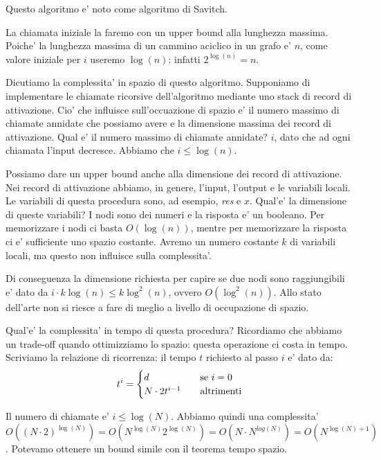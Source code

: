 Questo algoritmo e' noto come algoritmo di Savitch.

La chiamata iniziale la faremo con un upper bound alla lunghezza massima. Poiche' la lunghezza
massima di un cammino aciclico in un grafo e' $n$, come valore iniziale per $i$ useremo $\log(n)$:
infatti $2^{\log(n)} = n$.

Dicutiamo la complessita' in spazio di questo algoritmo. Supponiamo di implementare le chiamate
ricorsive dell'algoritmo mediante uno stack di record di attivazione. Cio' che influisce
sull'occuazione di spazio e' il numero massimo di chiamate annidate che possiamo avere e la
dimensione massima dei record di attivazione. Qual e' il numero massimo di chiamate annidate? $i$,
dato che ad ogni chiamata l'input decresce. Abbiamo che $i \leq \log(n)$.

Possiamo dare un upper bound anche alla dimensione dei record di attivazione. Nei record di
attivazione abbiamo, in genere, l'input, l'output e le variabili locali. Le variabili di questa
procedura sono, ad esempio, \textit{res} e $x$. Qual'e' la dimensione di queste variabili? I nodi
sono dei numeri e la risposta e' un booleano. Per memorizzare i nodi ci basta $O(\log(n))$, mentre
per memorizzare la risposta ci e' sufficiente uno spazio costante. Avremo un numero costante $k$ di
variabili locali, ma questo non influisce sulla complessita'.

Di conseguenza la dimensione richiesta per capire se due nodi sono raggiungibili e' dato da $i\cdot
k\log(n) \leq k\log^{2}(n)$, ovvero $O(\log^{2}(n))$. Allo stato dell'arte non si riesce a fare di
meglio a livello di occupazione di spazio.

Qual'e' la complessita' in tempo di questa procedura? Ricordiamo che abbiamo un trade-off quando
ottimizziamo lo spazio: questa operazione ci costa in tempo. Scriviamo la relazione di ricorrenza:
il tempo $t$ richiesto al passo $i$ e' dato da:
\begin{equation*}
    t^{i} = 
    \begin{cases}
        d \quad &\text{se $i = 0$}\\
        N\cdot 2t^{i-1} \quad &\text{altrimenti}\\
    \end{cases}
\end{equation*}

Il numero di chiamate e' $i \leq \log(N)$. Abbiamo quindi una complessita' $O((N\cdot 2)^{\log(N)})
= O(N^{\log(N)}2^{\log(N)}) = O(N\cdot N^{log(N)}) = O(N^{\log(N)+1})$. Potevamo ottenere un bound
simile con il teorema tempo spazio.

